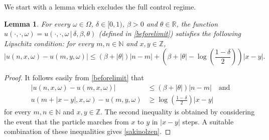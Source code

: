 \documentclass[a4paper]{amsart}
\numberwithin{equation}{section}
\theoremstyle{plain}
\newtheorem{lemma}[theorem]{\sc Lemma}
\theoremstyle{remark}
\begin{document}
We start with a lemma which excludes the full control regime.

\begin{lemma}\label{cansene}
For every $\omega\in\Omega$, $\delta\in[0,1)$, $\beta > 0$ and $\theta\in\mathbb{R}$, the function $u(\cdot,\cdot,\omega) = u(\cdot,\cdot,\omega\,|\,\delta,\beta,\theta)$ (defined in \eqref{beforelimit}) satisfies the following Lipschitz condition: for every $m,n\in\mathbb{N}$ and $x,y\in\mathbb{Z}$, 
\begin{equation}\label{sakinolzen}
|u(n,x,\omega) - u(m,y,\omega)| \le (\beta + |\theta|)|n-m| + (\beta + |\theta| - \textstyle{\log(\frac{1-\delta}{2})})|x-y|.
\end{equation}
\end{lemma}

\begin{proof}
It follows easily from \eqref{beforelimit} that
\begin{align*}
|u(n,x,\omega) - u(m,x,\omega)| &\le (\beta + |\theta|)|n-m|\quad\text{and}\\
u(m + |x-y|,x,\omega) - u(m,y,\omega) &\ge \textstyle{\log(\frac{1-\delta}{2})|x-y|}
\end{align*}
for every $m,n\in\mathbb{N}$ and $x,y\in\mathbb{Z}$. The second inequality is obtained by considering the event that the particle marches from $x$ to $y$ in $|x-y|$ steps. A suitable combination of these inequalities gives \eqref{sakinolzen}.
\end{proof}
\end{document}
